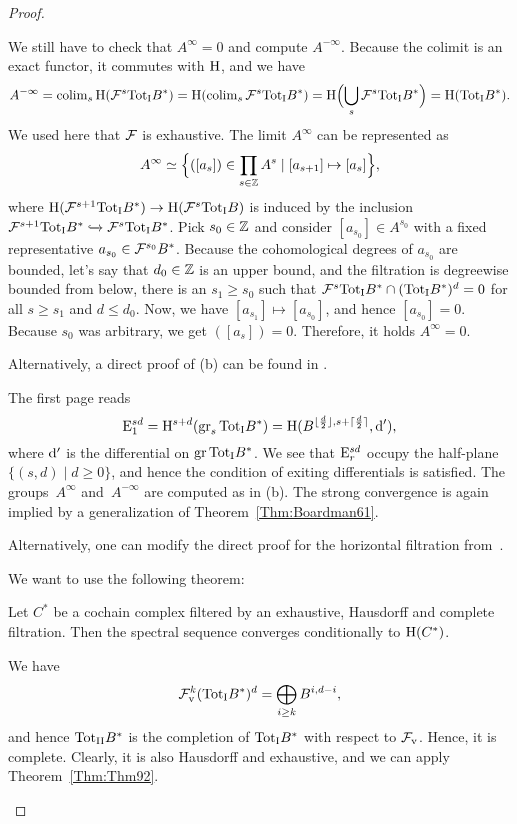 \documentclass[\MainFolder/Text.tex]{subfiles}
\begin{document}
\begin{proof}
\begin{ProofList}
We still have to check that $A^{\infty}=0$ and compute $A^{-\infty}$. Because the colimit is an exact functor, it commutes with $\mathrm{H}$, and we have
\[ A^{-\infty} = \operatorname{colim}_s \mathrm{H}(\mathcal{F}^s{\mathrm{Tot}_{\mathrm{I}}} B^*) = \mathrm{H}(\operatorname{colim}_s\mathcal{F}^s{\mathrm{Tot}_{\mathrm{I}}} B^*) = \mathrm{H}\Bigl(\bigcup_s \mathcal{F}^s {\mathrm{Tot}_{\mathrm{I}}} B^*\Bigr) = \mathrm{H}({\mathrm{Tot}_{\mathrm{I}}} B^*). \]
We used here that $\mathcal{F}$ is exhaustive. The limit $A^\infty$ can be represented as
\[ A^\infty \simeq \Bigl\{([a_s]) \in \prod_{s\in \mathbb{Z}} A^s \mid [a_{s+1}]\mapsto [a_s]\Bigr\}, \]
where $\mathrm{H}(\mathcal{F}^{s+1}{\mathrm{Tot}_{\mathrm{I}}} B^*) \rightarrow \mathrm{H}(\mathcal{F}^s {\mathrm{Tot}_{\mathrm{I}}} B)$ is induced by the inclusion $\mathcal{F}^{s+1}{\mathrm{Tot}_{\mathrm{I}}} B^* \xhookrightarrow{} \mathcal{F}^s {\mathrm{Tot}_{\mathrm{I}}} B^*$. Pick $s_0\in \mathbb{Z}$ and consider $[a_{s_0}] \in A^{s_0}$ with a fixed representative $a_{s_0}\in \mathcal{F}^{s_0} B^*$. Because the cohomological degrees of $a_{s_0}$ are bounded, let's say that $d_0\in \mathbb{Z}$ is an upper bound, and the filtration is degreewise bounded from below, there is an $s_1 \ge s_0$ such that $\mathcal{F}^{s} {\mathrm{Tot}_{\mathrm{I}}} B^* \cap ({\mathrm{Tot}_{\mathrm{I}}} B^*)^{d} = 0$ for all $s\ge s_1$ and $d\le d_0$. Now, we have $[a_{s_1}] \mapsto [a_{s_0}]$, and hence $[a_{s_0}] = 0$. Because $s_0$ was arbitrary, we get $([a_s]) = 0$. Therefore, it holds $A^\infty=0$.

Alternatively, a direct proof of (b) can be found in \cite{Cencelj1998}.

\item The first page reads
\[\mathrm{E}_1^{sd} = \mathrm{H}^{s+d}(\operatorname{\mathrm{gr}}_s {\mathrm{Tot}_{\mathrm{I}}} B^*) = \mathrm{H}(B^{\lfloor\frac{d}{2}\rfloor,s+\lceil\frac{d}{2}\rceil},\mathrm{d}'), \]
where $\mathrm{d}'$ is the differential on $\operatorname{\mathrm{gr}} {\mathrm{Tot}_{\mathrm{I}}} B^*$. We see that $\mathrm{E}_r^{sd}$ occupy the half-plane $\{(s,d)\mid d\ge 0\}$, and hence the condition of exiting differentials is satisfied. The groups~$A^\infty$ and~$A^{-\infty}$ are computed as in (b). The strong convergence is again implied by a generalization of Theorem~\ref{Thm:Boardman61}.

Alternatively, one can modify the direct proof for the horizontal filtration from~\cite{Cencelj1998}.

\item We want to use the following theorem:
\begin{ProofTheorem}\label{Thm:Thm92}
Let $C^*$ be a cochain complex filtered by an exhaustive, Hausdorff and complete filtration. Then the spectral sequence converges conditionally to $\mathrm{H}(C^*)$.
\end{ProofTheorem}
We have
\[ \mathcal{F}^k_{{\mathrm{v}}} ({\mathrm{Tot}_{\mathrm{I}}} B^*)^d = \bigoplus_{i\ge k} B^{i,d-i}, \]
and hence ${\mathrm{Tot}_{\mathrm{II}}} B^*$ is the completion of ${\mathrm{Tot}_{\mathrm{I}}} B^*$ with respect to $\mathcal{F}_{{\mathrm{v}}}$. Hence, it is complete. Clearly, it is also Hausdorff and exhaustive, and we can apply Theorem~\ref{Thm:Thm92}.


\end{ProofList}
\end{proof}
\end{document}
